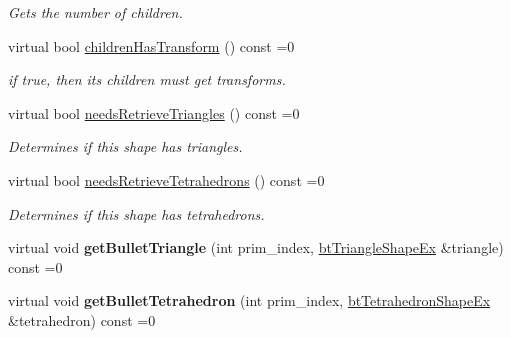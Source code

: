 \begin{DoxyCompactItemize}
\begin{DoxyCompactList}\small\item\em Gets the number of children. \end{DoxyCompactList}\item 
\hypertarget{classbt_g_impact_shape_interface_a9ea24ba36990721e4f55851afc421e06}{virtual bool \hyperlink{classbt_g_impact_shape_interface_a9ea24ba36990721e4f55851afc421e06}{children\+Has\+Transform} () const =0}\label{classbt_g_impact_shape_interface_a9ea24ba36990721e4f55851afc421e06}

\begin{DoxyCompactList}\small\item\em if true, then its children must get transforms. \end{DoxyCompactList}\item 
\hypertarget{classbt_g_impact_shape_interface_a62093ef330529ac27df9538313ece90a}{virtual bool \hyperlink{classbt_g_impact_shape_interface_a62093ef330529ac27df9538313ece90a}{needs\+Retrieve\+Triangles} () const =0}\label{classbt_g_impact_shape_interface_a62093ef330529ac27df9538313ece90a}

\begin{DoxyCompactList}\small\item\em Determines if this shape has triangles. \end{DoxyCompactList}\item 
\hypertarget{classbt_g_impact_shape_interface_ad3f86cd0b7d0bbfd272fd6e815e17485}{virtual bool \hyperlink{classbt_g_impact_shape_interface_ad3f86cd0b7d0bbfd272fd6e815e17485}{needs\+Retrieve\+Tetrahedrons} () const =0}\label{classbt_g_impact_shape_interface_ad3f86cd0b7d0bbfd272fd6e815e17485}

\begin{DoxyCompactList}\small\item\em Determines if this shape has tetrahedrons. \end{DoxyCompactList}\item 
\hypertarget{classbt_g_impact_shape_interface_a6f9c334805d5bff662e4946eac079a20}{virtual void {\bfseries get\+Bullet\+Triangle} (int prim\+\_\+index, \hyperlink{classbt_triangle_shape_ex}{bt\+Triangle\+Shape\+Ex} \&triangle) const =0}\label{classbt_g_impact_shape_interface_a6f9c334805d5bff662e4946eac079a20}

\item 
\hypertarget{classbt_g_impact_shape_interface_a6259c51d1c8c8239efdd1dd4b918e139}{virtual void {\bfseries get\+Bullet\+Tetrahedron} (int prim\+\_\+index, \hyperlink{classbt_tetrahedron_shape_ex}{bt\+Tetrahedron\+Shape\+Ex} \&tetrahedron) const =0}\label{classbt_g_impact_shape_interface_a6259c51d1c8c8239efdd1dd4b918e139}


\end{DoxyCompactItemize}
